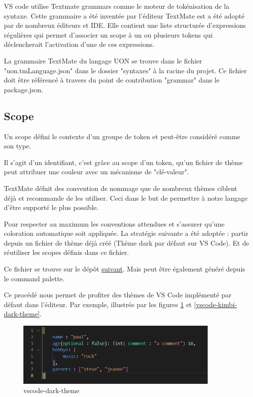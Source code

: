 \documentclass[
    iict, %
    il, %
]{heig-tb}
\begin{document}
VS code utilise Textmate grammars comme le moteur de tokénisation de la syntaxe.
Cette grammaire a été inventée par l'éditeur TextMate est a été adopté par de nombreux éditeurs et IDE.
Elle contient une liste structurée d'expressions régulières qui permet d'associer un scope
à un ou plusieurs tokens qui déclencherait l'activation d'une de ces expressions. \cite{syntax-highlight-guide}

La grammaire TextMate du langage UON se trouve dans le fichier "uon.tmLanguage.json" dans le dossier "syntaxes" à la racine du projet.
Ce fichier doit être référencé à travers du point de contribution "grammar" dans le package.json.

\subsection{Scope}
Un scope défini le contexte d'un groupe de token et peut-être considéré comme son type.

Il s'agit d'un identifiant, c'est grâce au scope d'un token, qu'un fichier de thème peut attribuer une couleur avec un mécanisme de "clé-valeur".

TextMate défnit des convention de nommage que de nombreux thèmes ciblent déjà et recommande de les utiliser.
Ceci dans le but de permettre à notre langage d'être supporté le plus possible. \cite{textmate-grammars}

Pour respecter au maximum les conventions attendues et s'assurer qu'une coloration automatique soit appliquée. La stratégie suivante a été adoptée : partir depuis un fichier de thème déjà créé (Thème dark par défaut sur VS Code). 
Et de réutiliser les scopes définis dans ce fichier.

Ce fichier se trouve sur le dépôt \href{https://github.com/microsoft/vscode/blob/main/extensions/theme-defaults/themes/dark_vs.json}{suivant}.
Mais peut être également généré depuis le command palette.

Ce procédé nous permet de profiter des thèmes de VS Code implémenté par défaut dans l'éditeur. Par exemple, illustrée par les figures \ref{vscode-dark-theme} et \ref{vscode-kimbi-dark-theme}.

\begin{figure}[!h]
    \begin{center}
        \includegraphics[width=10cm]{assets/figures/vscode-dark-theme.PNG}
    \end{center}
    \caption[Thème vscode dark]{\label{vscode-dark-theme} vscode-dark-theme}
\end{figure}
\end{document}
